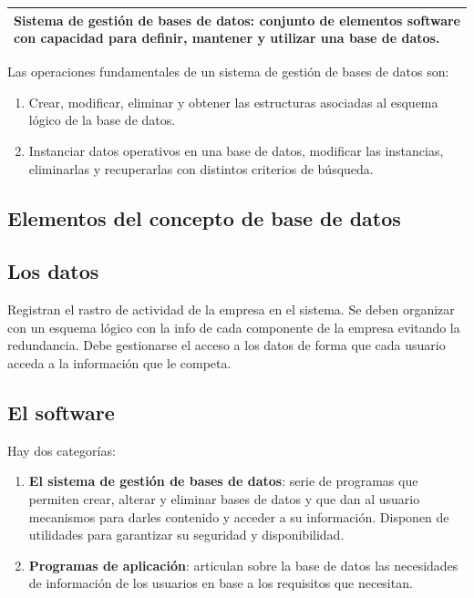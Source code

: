 \documentclass[10pt,a4paper,spanish]{report}
\begin{document}
\begin{center}
\begin{tabular}{|p{12cm}|}
\hline
\textcolor[rgb]{1,0.2,0.3}{\textbf{Sistema de gestión de bases de datos}}: conjunto de elementos software con capacidad para definir, mantener y utilizar una base de datos. \\
\hline
\end{tabular}
\end{center}

Las operaciones fundamentales de un sistema de gestión de bases de datos son:

\begin{enumerate}[$\heartsuit$]
    \item Crear, modificar, eliminar y obtener las estructuras asociadas al esquema lógico de la base de datos.
    \item Instanciar datos operativos en una base de datos, modificar las instancias, eliminarlas y recuperarlas con distintos criterios de búsqueda.
\end{enumerate}

\textcolor[rgb]{1,0.2,0.3}{\section{Elementos del concepto de base de datos}}
\textcolor[rgb]{1,0.2,0.3}{\subsection{Los datos}}
Registran el rastro de actividad de la empresa en el sistema. Se deben organizar con un esquema lógico con la info de cada componente de la empresa evitando la redundancia. Debe gestionarse el acceso a los datos de forma que cada usuario acceda a la información que le competa.

\textcolor[rgb]{1,0.2,0.3}{\subsection{El software}}
Hay dos categorías:
\begin{enumerate}[$\heartsuit$]
    \item \textcolor[rgb]{1,0.2,0.3}{\textbf{El sistema de gestión de bases de datos}}: serie de programas que permiten crear, alterar y eliminar bases de datos y que dan al usuario mecanismos para darles contenido y acceder a su información. Disponen de utilidades para garantizar su seguridad y disponibilidad.
    \item \textcolor[rgb]{1,0.2,0.3}{\textbf{Programas de aplicación}}: articulan sobre la base de datos las necesidades de información de los usuarios en base a los requisitos que necesitan.
\end{enumerate}
\end{document}
